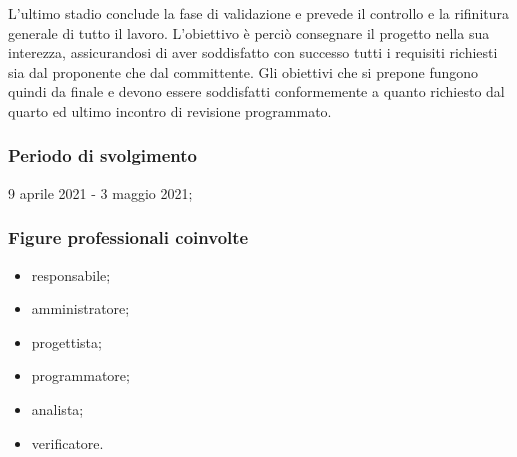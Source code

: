 L'ultimo stadio conclude la fase di validazione e prevede il controllo e la rifinitura generale di tutto il lavoro. L'obiettivo è perciò consegnare il progetto nella sua interezza, assicurandosi di aver soddisfatto con successo tutti i requisiti richiesti sia dal proponente che dal committente. Gli obiettivi che si prepone fungono quindi da  finale e devono essere soddisfatti conformemente a quanto richiesto dal quarto ed ultimo incontro di revisione programmato.
        
        \subsubsection{Periodo di svolgimento}
        9 aprile 2021 - 3 maggio 2021;
        
        \subsubsection{Figure professionali coinvolte}
            \begin{itemize}
                \item responsabile;
                \item amministratore;
                \item progettista;
                \item programmatore;
                \item analista;
                \item verificatore.
            \end{itemize}


